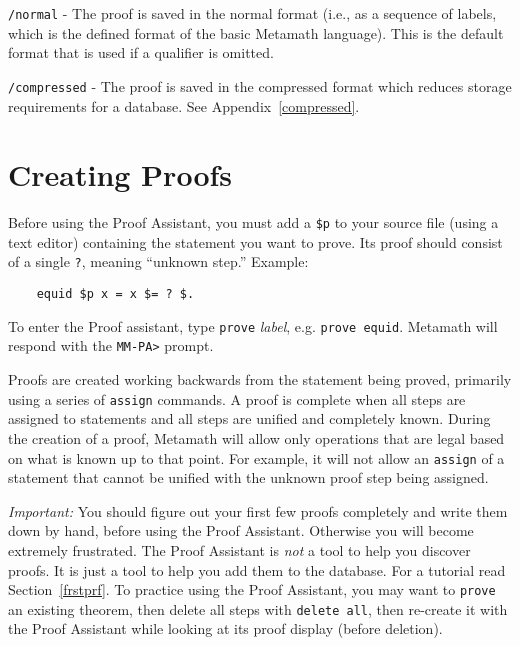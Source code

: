     \texttt{/normal} - The proof is saved in the normal format (i.e., as a
        sequence
        of labels, which is the defined format of the basic Metamath
        language).  This is the default format that
        is used if a qualifier
        is omitted.

    \texttt{/compressed} - The proof is saved in the compressed format which
        reduces storage requirements for a database.
        See Appendix~\ref{compressed}.




\section{Creating Proofs}\label{pfcommands}

Before using the Proof Assistant, you must add a \texttt{\$p} to your
source file (using a text editor) containing the statement you want to
prove.  Its proof should consist of a single \texttt{?}, meaning
``unknown step.''  Example:
\begin{verbatim}
    equid $p x = x $= ? $.
\end{verbatim}

To enter the Proof assistant, type \texttt{prove} {\em label}, e.g.
\texttt{prove equid}.  Metamath will respond with the \texttt{MM-PA>}
prompt.

Proofs are created working backwards from the statement being proved,
primarily using a series of \texttt{assign} commands.  A proof is
complete when all steps are assigned to statements and all steps are
unified and completely known.  During the creation of a proof, Metamath
will allow only operations that are legal based on what is known up to
that point.  For example, it will not allow an \texttt{assign} of a
statement that cannot be unified with the unknown proof step being
assigned.

{\em Important:} You should figure out your first few proofs completely
and write them down by hand, before using the Proof Assistant.
Otherwise you will become extremely frustrated.  The Proof Assistant is
{\em not} a tool to help you discover proofs.  It is just a tool to help
you add them to the database.  For a tutorial read
Section~\ref{frstprf}.  To practice using the Proof Assistant, you may
want to \texttt{prove} an existing theorem, then delete all steps with
\texttt{delete all}, then re-create it with the Proof Assistant while
looking at its proof display (before deletion).

